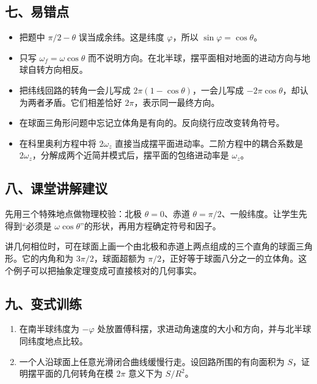 \documentclass[12pt,a4paper,UTF8]{ctexart}
\newcommand{\tightlist}{\setlength{\itemsep}{0pt}\setlength{\parskip}{0pt}}
\begin{document}
\subsection{七、易错点}\label{ux4e03ux6613ux9519ux70b9-5}

\begin{itemize}
\tightlist
\item
  把题中 \(\pi/2-\theta\) 误当成余纬。这是纬度 \(\varphi\)，所以
  \(\sin\varphi=\cos\theta\)。
\item
  只写 \(\omega_f=\omega\cos\theta\)
  而不说明方向。在北半球，摆平面相对地面的进动方向与地球自转方向相反。
\item
  把纬线回路的转角一会儿写成 \(2\pi(1-\cos\theta)\)，一会儿写成
  \(-2\pi\cos\theta\)，却认为两者矛盾。它们相差恰好
  \(2\pi\)，表示同一最终方向。
\item
  在球面三角形问题中忘记立体角是有向的。反向绕行应改变转角符号。
\item
  在科里奥利方程中将 \(2\omega_z\)
  直接当成摆平面进动率。二阶方程中的耦合系数是
  \(2\omega_z\)，分解成两个近简并模式后，摆平面的包络进动率是
  \(\omega_z\)。
\end{itemize}

\subsection{八、课堂讲解建议}\label{ux516bux8bfeux5802ux8bb2ux89e3ux5efaux8bae-5}

先用三个特殊地点做物理校验：北极 \(\theta=0\)、赤道
\(\theta=\pi/2\)、一般纬度。让学生先得到``必须是
\(\omega\cos\theta\)''的形状，再用方程确定符号和因子。

讲几何相位时，可在球面上画一个由北极和赤道上两点组成的三个直角的球面三角形。它的内角和为
\(3\pi/2\)，球面超额为
\(\pi/2\)，正好等于球面八分之一的立体角。这个例子可以把抽象定理变成可直接核对的几何事实。

\subsection{九、变式训练}\label{ux4e5dux53d8ux5f0fux8badux7ec3-5}

\begin{enumerate}
\def\labelenumi{\arabic{enumi}.}
\tightlist
\item
  在南半球纬度为 \(-\varphi\)
  处放置傅科摆，求进动角速度的大小和方向，并与北半球同纬度地点比较。
\item
  一个人沿球面上任意光滑闭合曲线缓慢行走。设回路所围的有向面积为
  \(S\)，证明摆平面的几何转角在模 \(2\pi\) 意义下为 \(S/R^2\)。
\end{enumerate}
\end{document}
